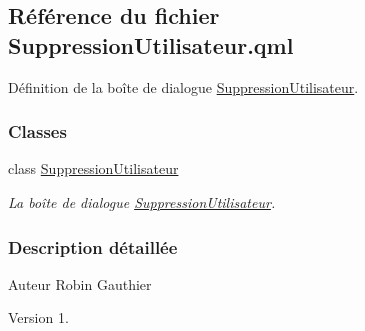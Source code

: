 \hypertarget{_suppression_utilisateur_8qml}{}\subsection{Référence du fichier Suppression\+Utilisateur.\+qml}
\label{_suppression_utilisateur_8qml}


Définition de la boîte de dialogue \hyperlink{class_suppression_utilisateur}{Suppression\+Utilisateur}.  


\subsubsection*{Classes}
\begin{DoxyCompactItemize}
\item 
class \hyperlink{class_suppression_utilisateur}{Suppression\+Utilisateur}
\begin{DoxyCompactList}\small\item\em La boîte de dialogue \hyperlink{class_suppression_utilisateur}{Suppression\+Utilisateur}. \end{DoxyCompactList}\end{DoxyCompactItemize}


\subsubsection{Description détaillée}
\begin{DoxyAuthor}{Auteur}
Robin Gauthier
\end{DoxyAuthor}
\begin{DoxyVersion}{Version}
1. 
\end{DoxyVersion}
